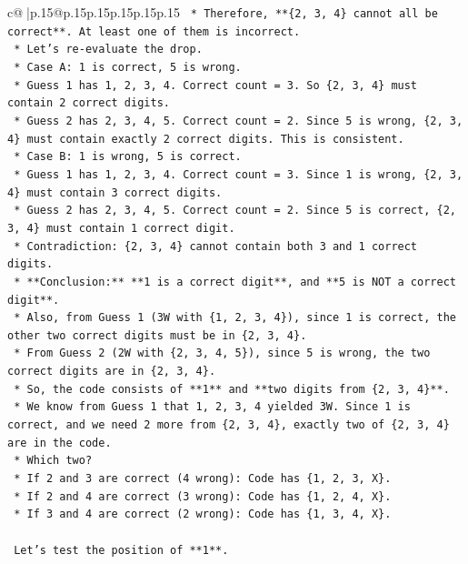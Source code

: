 \documentclass{article}
\begin{document}
{\begin{supertabular}{c@{$\;$}|p{.15\linewidth}@{}p{.15\linewidth}p{.15\linewidth}p{.15\linewidth}p{.15\linewidth}p{.15\linewidth}}
{{{\texttt{    *   Therefore, **\{2, 3, 4\} cannot all be correct**. At least one of them is incorrect.} \\
\texttt{    *   Let's re{-}evaluate the drop.} \\
\texttt{        *   Case A: 1 is correct, 5 is wrong.} \\
\texttt{            *   Guess 1 has 1, 2, 3, 4. Correct count = 3. So \{2, 3, 4\} must contain 2 correct digits.} \\
\texttt{            *   Guess 2 has 2, 3, 4, 5. Correct count = 2. Since 5 is wrong, \{2, 3, 4\} must contain exactly 2 correct digits. This is consistent.} \\
\texttt{        *   Case B: 1 is wrong, 5 is correct.} \\
\texttt{            *   Guess 1 has 1, 2, 3, 4. Correct count = 3. Since 1 is wrong, \{2, 3, 4\} must contain 3 correct digits.} \\
\texttt{            *   Guess 2 has 2, 3, 4, 5. Correct count = 2. Since 5 is correct, \{2, 3, 4\} must contain 1 correct digit.} \\
\texttt{            *   Contradiction: \{2, 3, 4\} cannot contain both 3 and 1 correct digits.} \\
\texttt{    *   **Conclusion:** **1 is a correct digit**, and **5 is NOT a correct digit**.} \\
\texttt{    *   Also, from Guess 1 (3W with \{1, 2, 3, 4\}), since 1 is correct, the other two correct digits must be in \{2, 3, 4\}.} \\
\texttt{    *   From Guess 2 (2W with \{2, 3, 4, 5\}), since 5 is wrong, the two correct digits are in \{2, 3, 4\}.} \\
\texttt{    *   So, the code consists of **1** and **two digits from \{2, 3, 4\}**.} \\
\texttt{    *   We know from Guess 1 that 1, 2, 3, 4 yielded 3W. Since 1 is correct, and we need 2 more from \{2, 3, 4\}, exactly two of \{2, 3, 4\} are in the code.} \\
\texttt{    *   Which two?} \\
\texttt{        *   If 2 and 3 are correct (4 wrong): Code has \{1, 2, 3, X\}.} \\
\texttt{        *   If 2 and 4 are correct (3 wrong): Code has \{1, 2, 4, X\}.} \\
\texttt{        *   If 3 and 4 are correct (2 wrong): Code has \{1, 3, 4, X\}.} \\
\\ 
\texttt{    Let's test the position of **1**.} \\
}}}
\end{supertabular}}
\end{document}
